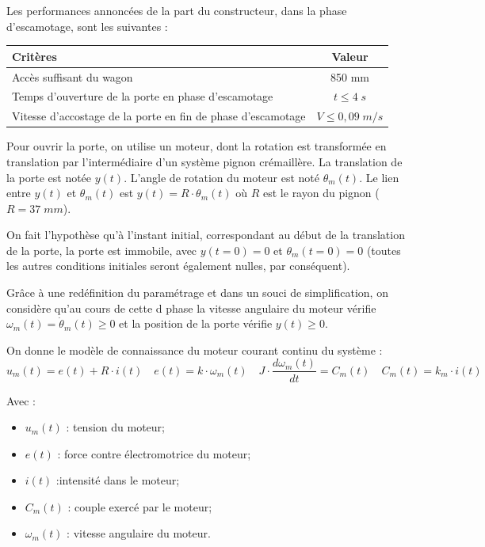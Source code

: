 \documentclass[10pt,fleqn]{article} %
\begin{document}
\begin{multicols}{2}
Les performances annoncées de la part du constructeur, dans la phase d'escamotage, sont les suivantes :
\begin{center}
\begin{tabular}{|p{.6\linewidth}|c|}
\hline
Critères & Valeur \\
\hline
\hline
Accès suffisant du wagon & 850 mm \\
\hline
Temps d'ouverture de la porte en phase d'escamotage & $t\leq 4\; s$ \\
\hline
Vitesse d’accostage de la porte en fin de phase d’escamotage & $V\leq 0,09 \; m/s$ \\
\hline
\end{tabular}
\end{center}


Pour ouvrir la porte, on utilise un moteur, dont la rotation est transformée en translation par l'intermédiaire d'un système pignon crémaillère. La translation de la porte est notée $y(t)$. L'angle de rotation du moteur est noté $\theta_m(t)$. Le lien entre $y(t)$ et $\theta_m (t)$ est $y(t) = R\cdot\theta_m (t)$ où $R$ est le rayon du pignon ($R=37\; mm$).

On fait l'hypothèse qu'à l'instant initial, correspondant au début de la translation de la porte, la porte est immobile, avec $y(t=0)=0$ et $\theta_m (t=0)=0$ (toutes les autres conditions initiales seront également nulles, par conséquent).

Grâce à une redéfinition du paramétrage et dans un souci de simplification, on considère qu'au cours de cette d phase la vitesse angulaire du moteur vérifie $\omega_m (t) = \dot{\theta}_m (t) \geq 0$ et la position de la porte vérifie $y(t) \geq 0$.  


On donne le modèle de connaissance du moteur courant continu du système :
$$u_m(t) = e(t) + R\cdot i(t) 
\quad e(t) = k\cdot \omega_m(t) 
\quad J\cdot \dfrac{d\omega_m(t)}{dt} = C_m (t)
\quad C_m (t) = k_m \cdot i(t)$$

Avec : 
\begin{itemize}
\item $u_m (t)$ : tension du moteur; 
\item $e(t)$ : force contre électromotrice du moteur; 
\item $i(t)$ :intensité dans le moteur;
\item $C_m (t)$ : couple exercé par le moteur;
\item $\omega_m(t)$ : vitesse angulaire du moteur.
\end{itemize}



\end{multicols}
\end{document}
